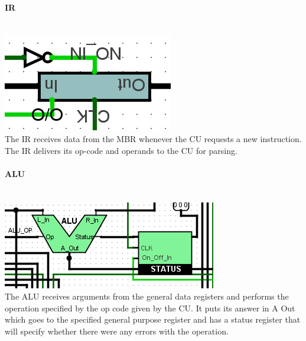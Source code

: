 \documentclass{mcgillhomework}
\begin{document}
	\paragraph{IR}~
	\\ \includegraphics[scale=0.5]{IR} \\ The IR receives data from the MBR whenever the CU requests a new instruction. The IR delivers its op-code and operands to the CU for parsing.
	\paragraph{ALU}~
	\\ \includegraphics[scale=0.5]{ALU} \\ The ALU receives arguments from the general data registers and performs the operation specified by the op code given by the CU. It puts its answer in A Out which goes to the specified general purpose register and has a status register that will specify whether there were any errors with the operation.
\end{document}
